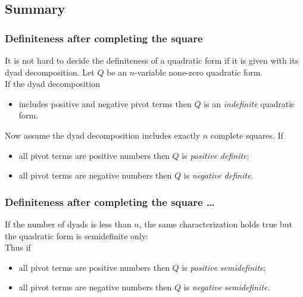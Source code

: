 \documentclass[aspectratio=169,notheorems]{corvinusmetropolis}
\theoremstyle{definition}
\begin{document}
\subsection{Summary}

\begin{frame}
    \frametitle{Definiteness after completing the square}
    It is not hard to decide the definiteness of a quadratic form if it is given with its dyad decomposition.
    Let $Q$ be an $n$-variable none-zero quadratic form.\\
    If the dyad decomposition 
    \begin{itemize}
        \item includes positive and negative pivot terms then $Q$ is an \alert{\emph{indefinite}} quadratic form.
    \end{itemize}
    Now assume the dyad decomposition includes exactly $n$ complete squares.
    If
    \begin{itemize}
        \item all pivot terms are positive numbers then $Q$ is \alert{\emph{positive definite}};
        \item all pivot terms are negative numbers then $Q$ is \alert{\emph{negative definite}}.
    \end{itemize}
\end{frame}
\begin{frame}
    \frametitle{Definiteness after completing the square \ldots}
    If the number of dyads is less than $n$, 
    the same characterization holds true but the quadratic form is semidefinite only:\\
    Thus if
    \begin{itemize}
        \item all pivot terms are positive numbers then $Q$ is \alert{\emph{positive semidefinite}};
        \item all pivot terms are negative numbers then $Q$ is \alert{\emph{negative semidefinite}}.
    \end{itemize}
\end{frame}

\end{document}

